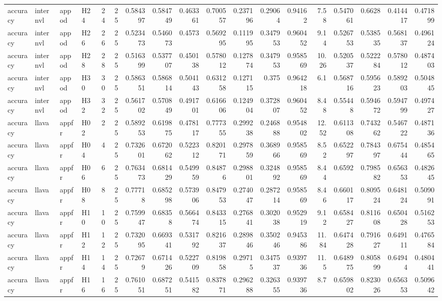 \begin{longtable}{llllrrrrrrrrrrrrrr}
accuracy & internvl & appod & H24 & 24 & 25 & 0.584397 & 0.584749 & 0.463361 & 0.700557 & 0.237196 & 0.29064 & 0.94162 & 7.58 & 0.547061 & 0.6628 & 0.414417 & 0.471899 \\
accuracy & internvl & appod & H26 & 26 & 25 & 0.523473 & 0.546073 & 0.4573 & 0.569295 & 0.111995 & 0.347953 & 0.960452 & 9.14 & 0.526753 & 0.538535 & 0.568137 & 0.496124 \\
accuracy & internvl & appod & H28 & 28 & 25 & 0.516399 & 0.537707 & 0.450138 & 0.578012 & 0.127874 & 0.347953 & 0.958569 & 10.26 & 0.520537 & 0.522284 & 0.578012 & 0.487403 \\
accuracy & internvl & appod & H30 & 30 & 25 & 0.586351 & 0.586814 & 0.504143 & 0.631258 & 0.127115 & 0.375 & 0.964218 & 6.1 & 0.568716 & 0.595623 & 0.589203 & 0.504845 \\
accuracy & internvl & appod & H32 & 32 & 25 & 0.561702 & 0.570849 & 0.491701 & 0.616606 & 0.124904 & 0.372807 & 0.960452 & 8.48 & 0.55448 & 0.594672 & 0.594799 & 0.497427 \\
accuracy & llava & appfr & H02 & 2 & 25 & 0.589253 & 0.619875 & 0.478117 & 0.777355 & 0.299238 & 0.246888 & 0.954802 & 12.52 & 0.611308 & 0.743262 & 0.546722 & 0.487136 \\
accuracy & llava & appfr & H04 & 4 & 25 & 0.732601 & 0.672062 & 0.522312 & 0.820171 & 0.297859 & 0.368966 & 0.958569 & 8.52 & 0.652297 & 0.784397 & 0.675444 & 0.485465 \\
accuracy & llava & appfr & H06 & 6 & 25 & 0.763473 & 0.681429 & 0.549959 & 0.84876 & 0.298801 & 0.324892 & 0.958569 & 8.44 & 0.6592 & 0.798582 & 0.656353 & 0.482645 \\
accuracy & llava & appfr & H08 & 8 & 25 & 0.77718 & 0.685298 & 0.573906 & 0.847953 & 0.274047 & 0.287214 & 0.958569 & 8.46 & 0.660117 & 0.809524 & 0.648124 & 0.509091 \\
accuracy & llava & appfr & H10 & 10 & 25 & 0.759947 & 0.68358 & 0.566474 & 0.843315 & 0.276841 & 0.302038 & 0.952919 & 9.12 & 0.658427 & 0.811608 & 0.650428 & 0.516253 \\
accuracy & llava & appfr & H12 & 12 & 25 & 0.732095 & 0.669341 & 0.531792 & 0.821637 & 0.289846 & 0.350246 & 0.945386 & 11.84 & 0.647428 & 0.791627 & 0.649111 & 0.476584 \\
accuracy & llava & appfr & H14 & 14 & 25 & 0.72679 & 0.671426 & 0.522709 & 0.819858 & 0.29715 & 0.347537 & 0.939736 & 11.5 & 0.648975 & 0.805899 & 0.64944 & 0.480441 \\
accuracy & llava & appfr & H16 & 16 & 25 & 0.761051 & 0.687251 & 0.541582 & 0.837871 & 0.296288 & 0.326355 & 0.939736 & 8.7 & 0.659802 & 0.823026 & 0.656353 & 0.509642 \\

\end{longtable}
